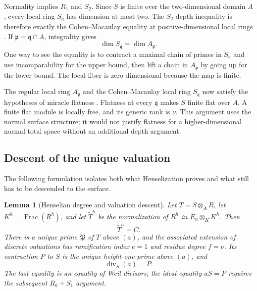 \documentclass[11pt]{article}
\newtheorem{lemma}[theorem]{Lemma}
\theoremstyle{definition}
\theoremstyle{remark}
\newcommand{\Frac}{\operatorname{Frac}}
\newcommand{\divisor}{\operatorname{div}}
\begin{document}
Normality implies $R_1$ and $S_2$.  Since $S$ is finite over the
two-dimensional domain $A$, every local ring $S_{\mathfrak q}$ has dimension
at most two.  The $S_2$ depth inequality is therefore exactly the
Cohen--Macaulay equality at positive-dimensional local rings
\citep{stacks-033p}.  If $\mathfrak p=\mathfrak q\cap A$, integrality gives
\[
 \dim S_{\mathfrak q}=\dim A_{\mathfrak p}.
\]
One way to see the equality is to contract a maximal chain of primes in
$S_{\mathfrak q}$ and use incomparability for the upper bound, then lift a
chain in $A_{\mathfrak p}$ by going up for the lower bound.  The local fiber
is zero-dimensional because the map is finite.

The regular local ring $A_{\mathfrak p}$ and the Cohen--Macaulay local ring
$S_{\mathfrak q}$ now satisfy the hypotheses of miracle flatness
\citep{stacks-00r4}.  Flatness at every $\mathfrak q$ makes $S$ finite flat
over $A$.  A finite flat module is locally free, and its generic rank is
$\nu$.  This argument uses the normal surface structure; it would not justify
flatness for a higher-dimensional normal total space without an additional
depth argument.

\subsection{Descent of the unique valuation}

The following formulation isolates both what Henselization proves and what
still has to be descended to the surface.

\begin{lemma}[Henselian degree and valuation descent]
\label{lem:henselian-valuation-descent}
Let $T=S\otimes_AR$, let $K^h=\Frac(R^h)$, and let $\widetilde T^h$ be the
normalization of $R^h$ in $E_n\otimes_KK^h$.  Then
\[
 \widetilde T^h=C.
\]
There is a unique prime $\mathfrak P$ of $T$ above $(a)$, and the associated
extension of discrete valuations has ramification index $e=1$ and residue
degree $f=\nu$.  Its contraction $P$ to $S$ is the unique height-one prime
above $(a)$, and
\[
 \divisor_S(a)=P.
\]
The last equality is an equality of Weil divisors; the ideal equality
$aS=P$ requires the subsequent $R_0+S_1$ argument.
\end{lemma}
\end{document}
